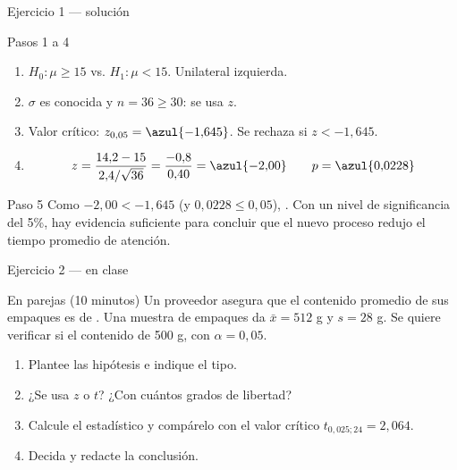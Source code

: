 \documentclass[aspectratio=169,10pt]{beamer}
\begin{document}
\begin{frame}{Ejercicio 1 — solución}
  \small
  \begin{block}{Pasos 1 a 4}
    \footnotesize
    \begin{enumerate}
      \item $H_0:\mu\ge 15$ \quad vs. \quad $H_1:\mu<15$. Unilateral
            izquierda.
      \item $\sigma$ es conocida y $n=36\ge 30$: se usa $z$.
      \item Valor crítico: $z_{0{,}05}=\azul{-1{,}645}$. Se rechaza si
            $z<-1{,}645$.
      \item \[ z=\frac{14{,}2-15}{2{,}4/\sqrt{36}}
                =\frac{-0{,}8}{0{,}40}=\azul{-2{,}00}
             \qquad p=\azul{0{,}0228} \]
    \end{enumerate}
  \end{block}

  \vspace{0.1cm}
  \begin{exampleblock}{Paso 5}
    \footnotesize
    Como $-2{,}00<-1{,}645$ (y $0{,}0228\le 0{,}05$), . Con un nivel de significancia del 5\%, hay evidencia suficiente
    para concluir que el nuevo proceso redujo el tiempo promedio de atención.
  \end{exampleblock}
\end{frame}

\begin{frame}{Ejercicio 2 — en clase}
  \begin{alertblock}{En parejas (10 minutos)}
    Un proveedor asegura que el contenido promedio de sus empaques es de
    . Una muestra de  empaques da
    $\bar{x}=512$ g y $s=28$ g. Se quiere verificar si el contenido
     de 500 g, con $\alpha=0{,}05$.

    \vspace{0.25cm}
    \begin{enumerate}
      \item Plantee las hipótesis e indique el tipo.
      \item ¿Se usa $z$ o $t$? ¿Con cuántos grados de libertad?
      \item Calcule el estadístico y compárelo con el valor crítico
            $t_{0{,}025;24}=2{,}064$.
      \item Decida y redacte la conclusión.
    \end{enumerate}
  \end{alertblock}
\end{frame}
\end{document}
